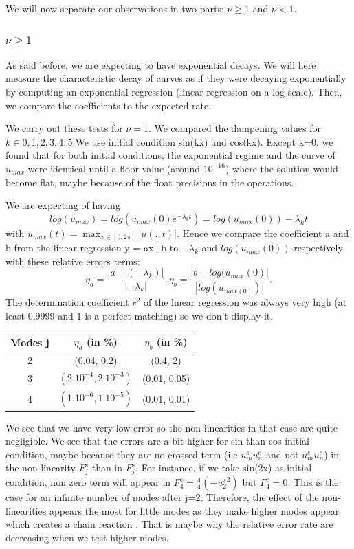 \documentclass[12pt]{article}
\begin{document}
We will now separate our observations in two parts: $\nu \geq1$ and $\nu <1$.

\subsubsection{\texorpdfstring{$\nu \geq 1$}{nu >= 1}}

As said before, we are expecting to have exponential decays. We will here measure the characteristic decay of curves as if they were decaying exponentially by computing an exponential regression (linear regression on a log scale). Then, we compare the coefficients to the expected rate. 

We carry out these tests for $\nu =1$. We compared the dampening values for $k \in {0, 1, 2, 3, 4, 5}.$We use initial condition sin(kx) and cos(kx). Except k=0, we found that for both initial conditions, the exponential regime and the curve of $u_{max}$ were identical until a floor value (around $10^{-16}$) where the solution would become flat, maybe because of the float precisions in the operations.

We are expecting of having $$log(u_{max}) = log(u_{max}(0)e^{-\lambda_k t}) = log(u_{max}(0)) -  \lambda_k t$$ with $u_{max}(t) = \max_{x\in[0,2\pi]}|u(.,t)|.$ Hence we compare the coefficient a and b from the linear regression y = ax+b to $-\lambda_k$ and $log(u_{max}(0))$ respectively with these relative errors terms: $$\eta_a = \frac{|a-(-\lambda_k)|}{|-\lambda_k|}, \eta_b = \frac{|b-log(u_{max}(0)|}{|log(u_{max(0)})|}.$$  The determination coefficient $r^2$ of the linear regression was always very high (at least 0.9999 and 1 is a perfect matching) so we don't display it. 

\begin{center}
\begin{tabular}{ |c|c|c| } 
 \hline
    Modes j  & $\eta_a$ (in \%) & $\eta_b$ (in \%)  \\
 \hline
 2 & (0.04, 0.2) & (0.4, 2) \\ 
 3 & $(2.10^{-4}, 2.10^{-3})$ & (0.01, 0.05) \\ 
 4 & $(1.10^{-6}, 1.10^{-5})$ & (0.01, 0.01) \\ 
 \hline
\end{tabular}
\end{center}

We see that we have very low error so the non-linearities in that case are quite negligible. We see that the errors are a bit higher for sin than cos initial condition, maybe because they are no crossed term (i.e $u_m^s u_n^c$ and not $u_m^c u_n^c$) in  the non linearity $F_j^s$ than in $F_j^s$. For instance, if we take sin(2x) as initial condition, non zero term will appear in $F_4^s=\frac{4}{4}(-{u_2^s}^2)$ but $F_4^c=0$. This is the case for an infinite number of modes after j=2. Therefore, the effect of the non-linearities appears the most for little modes as they make higher modes appear which creates a chain reaction . That is maybe why the relative error rate are decreasing when we test higher modes. 
\end{document}
